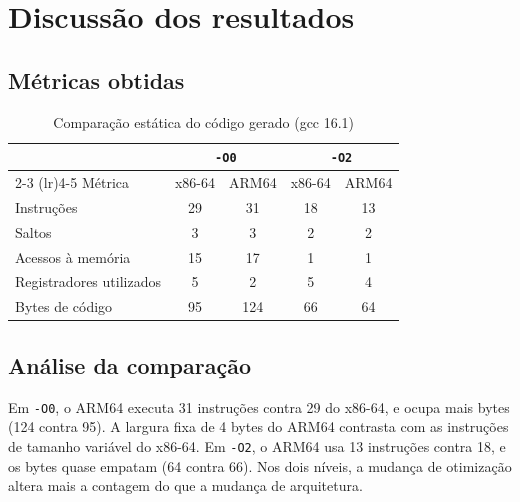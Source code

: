 \chapter{Discussão dos resultados}
\label{cap:discussao}

\section{Métricas obtidas}
\begin{table}[htb]
    \caption{Comparação estática do código gerado (gcc 16.1)}
    \label{tab:comparacao}
    \centering
    \begin{tabular}{lcccc}
        \toprule
                                 & \multicolumn{2}{c}{\texttt{-O0}} & \multicolumn{2}{c}{\texttt{-O2}}                  \\
        \cmidrule(lr){2-3} \cmidrule(lr){4-5}
        Métrica                  & x86-64                           & ARM64                            & x86-64 & ARM64 \\
        \midrule
        Instruções               & 29                               & 31                               & 18     & 13    \\
        Saltos                   & 3                                & 3                                & 2      & 2     \\
        Acessos à memória        & 15                               & 17                               & 1      & 1     \\
        Registradores utilizados & 5                                & 2                                & 5      & 4     \\
        Bytes de código          & 95                               & 124                              & 66     & 64    \\
        \bottomrule
    \end{tabular}
\end{table}

\section{Análise da comparação}
Em \texttt{-O0}, o ARM64 executa 31 instruções contra 29 do x86-64, e ocupa mais bytes (124 contra 95). A largura fixa de 4 bytes do ARM64 contrasta com as instruções de tamanho variável do x86-64. Em \texttt{-O2}, o ARM64 usa 13 instruções contra 18, e os bytes quase empatam (64 contra 66). Nos dois níveis, a mudança de otimização altera mais a contagem do que a mudança de arquitetura.

